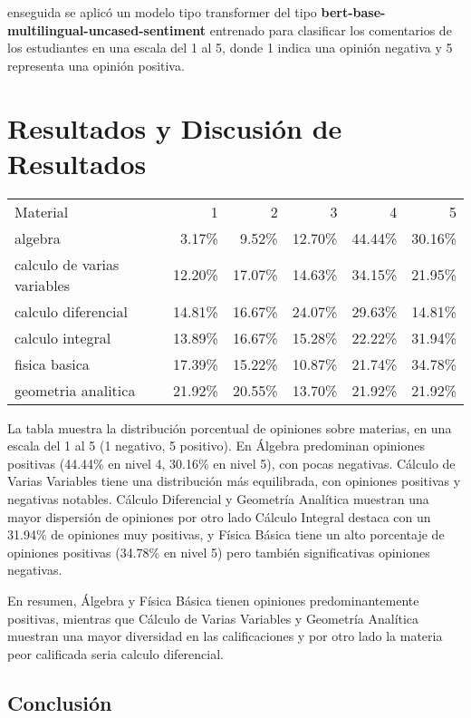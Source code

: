 \documentclass[a4paper,12pt]{article}
\begin{document}
enseguida se aplicó un modelo tipo transformer del tipo \textbf{bert-base-multilingual-uncased-sentiment} entrenado para clasificar los comentarios de los estudiantes  en una escala del 1 al 5, donde 1 indica una opinión negativa y 5 representa una opinión positiva.

\section{Resultados y Discusión de Resultados}
\begin{center}
\begin{tabular}{lrrrrr}
    Material & 1 & 2 & 3 & 4 & 5 \\
    algebra & 3.17\% & 9.52\% & 12.70\% & 44.44\% & 30.16\% \\
    calculo de varias variables & 12.20\% & 17.07\% & 14.63\% & 34.15\% & 21.95\% \\
    calculo diferencial & 14.81\% & 16.67\% & 24.07\% & 29.63\% & 14.81\% \\
    calculo integral & 13.89\% & 16.67\% & 15.28\% & 22.22\% & 31.94\% \\
    fisica basica & 17.39\% & 15.22\% & 10.87\% & 21.74\% & 34.78\% \\
    geometria analitica & 21.92\% & 20.55\% & 13.70\% & 21.92\% & 21.92\% \\
\end{tabular}
\end{center}

La tabla muestra la distribución porcentual de opiniones sobre materias, en una escala del 1 al 5 (1 negativo, 5 positivo). En Álgebra predominan opiniones positivas (44.44\% en nivel 4, 30.16\% en nivel 5), con pocas negativas. Cálculo de Varias Variables tiene una distribución más equilibrada, con opiniones positivas y negativas notables. Cálculo Diferencial y Geometría Analítica muestran una mayor dispersión de opiniones por otro lado Cálculo Integral destaca con un 31.94\% de opiniones muy positivas, y Física Básica tiene un alto porcentaje de opiniones positivas (34.78\% en nivel 5) pero también significativas opiniones negativas.

En resumen, Álgebra y Física Básica tienen opiniones predominantemente positivas, mientras que Cálculo de Varias Variables y Geometría Analítica muestran una mayor diversidad en las calificaciones y por otro lado la materia peor calificada seria calculo diferencial.

\subsection{Conclusión}
\end{document}
